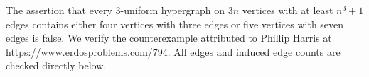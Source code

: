 The assertion that every \(3\)-uniform hypergraph on \(3n\)
vertices with at least \(n^3+1\) edges contains either four
vertices with three edges or five vertices with seven edges
is false. We verify the counterexample attributed to
Phillip Harris at \url{https://www.erdosproblems.com/794}.
All edges and induced edge counts are checked directly below.
